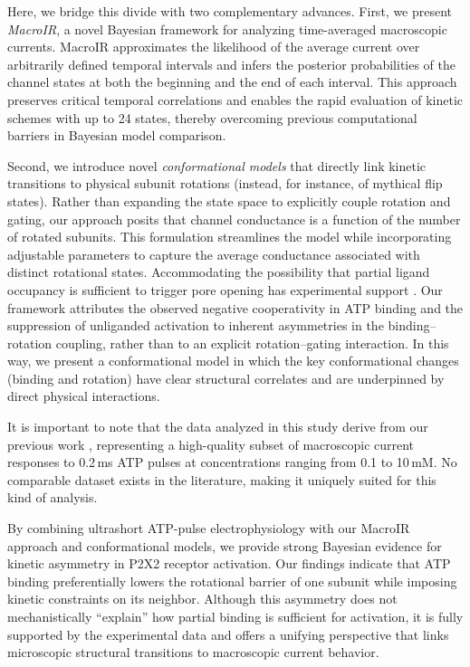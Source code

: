 \documentclass[pdflatex,sn-mathphys-num]{sn-jnl}%
\theoremstyle{thmstyleone}%
\theoremstyle{thmstyletwo}%
\theoremstyle{thmstylethree}%
\begin{document}
Here, we bridge this divide with two complementary advances. First, we present \textit{MacroIR}, a novel Bayesian framework for analyzing time-averaged macroscopic currents. MacroIR approximates the likelihood of the average current over arbitrarily defined temporal intervals and infers the posterior probabilities of the channel states at both the beginning and the end of each interval. This approach preserves critical temporal correlations and enables the rapid evaluation of kinetic schemes with up to 24 states, thereby overcoming previous computational barriers in Bayesian model comparison.

Second, we introduce novel \textit{conformational models} that directly link kinetic transitions to physical subunit rotations (instead, for instance, of mythical flip states). Rather than expanding the state space to explicitly couple rotation and gating, our approach posits that channel conductance is a function of the number of rotated subunits. This formulation streamlines the model while incorporating adjustable parameters to capture the average conductance associated with distinct rotational states. Accommodating the possibility that partial ligand occupancy is sufficient to trigger pore opening has experimental support \cite{Stelmashenko2012ActivationOT}. Our framework attributes the observed negative cooperativity in ATP binding \cite{Sattler2020UnravellingTI} and the suppression of unliganded activation \cite{Stelmashenko2012ActivationOT} to inherent asymmetries in the binding–rotation coupling, rather than to an explicit rotation–gating interaction. In this way, we present a conformational model in which the key conformational changes (binding and rotation) have clear structural correlates and are underpinned by direct physical interactions.

It is important to note that the data analyzed in this study derive from our previous work \cite{Moffatt_hume}, representing a high-quality subset of macroscopic current responses to 0.2\,ms ATP pulses at concentrations ranging from 0.1 to 10\,mM. No comparable dataset exists in the literature, making it uniquely suited for this kind of analysis.

By combining ultrashort ATP-pulse electrophysiology with our MacroIR approach and conformational models, we provide strong Bayesian evidence for kinetic asymmetry in P2X2 receptor activation. Our findings indicate that ATP binding preferentially lowers the rotational barrier of one subunit while imposing kinetic constraints on its neighbor. Although this asymmetry does not mechanistically “explain” how partial binding is sufficient for activation, it is fully supported by the experimental data and offers a unifying perspective that links microscopic structural transitions to macroscopic current behavior.
\end{document}
